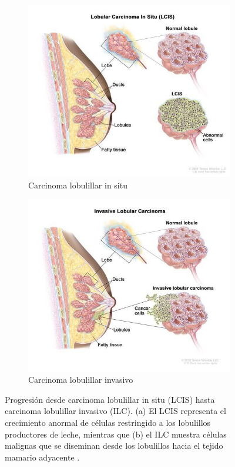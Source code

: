 \documentclass[a4paper,10pt]{book}
\begin{document}
\begin{figure}[h!]
	\centering
	\begin{subfigure}[c]{0.48\textwidth}
		\centering
		\includegraphics[width=\textwidth]{reports/assets/lcis.jpg}
		\caption{Carcinoma lobulillar in situ}
		\label{fig:lcis}
	\end{subfigure}
	\begin{subfigure}[c]{0.48\textwidth}
		\centering
		\includegraphics[width=\textwidth]{reports/assets/ilc.jpg}
		\caption{Carcinoma lobulillar invasivo}
		\label{fig:ilc}
	\end{subfigure}
	\caption[Comparación LCIS vs. ILC]{Progresión desde carcinoma lobulillar in situ (LCIS) hasta carcinoma lobulillar invasivo (ILC). (a) El LCIS representa el crecimiento anormal de células restringido a los lobulillos productores de leche, mientras que (b) el ILC muestra células malignas que se diseminan desde los lobulillos hacia el tejido mamario adyacente \cite{noauthor_nci_2011}.}
	\label{fig:histological_types_two}
\end{figure}
\end{document}
